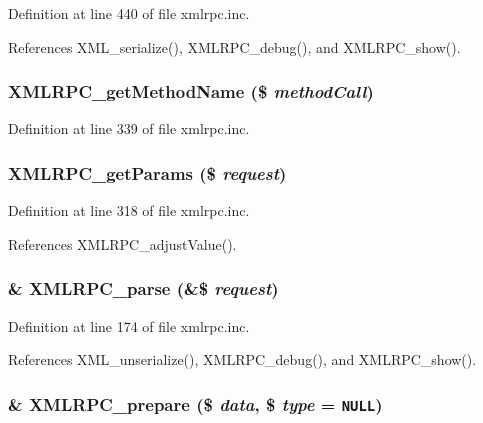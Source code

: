 Definition at line 440 of file xmlrpc.inc.

References XML\_\-serialize(), XMLRPC\_\-debug(), and XMLRPC\_\-show().\hypertarget{xmlrpc_8inc_70efa062e92a380196ed8053850c0906}{
\subsubsection{\setlength{\rightskip}{0pt plus 5cm}XMLRPC\_\-getMethodName (\$ {\em methodCall})}}
\label{xmlrpc_8inc_70efa062e92a380196ed8053850c0906}




Definition at line 339 of file xmlrpc.inc.\hypertarget{xmlrpc_8inc_ce4ea8e1274ca2ee3f51ec5a724f00f3}{
\subsubsection{\setlength{\rightskip}{0pt plus 5cm}XMLRPC\_\-getParams (\$ {\em request})}}
\label{xmlrpc_8inc_ce4ea8e1274ca2ee3f51ec5a724f00f3}




Definition at line 318 of file xmlrpc.inc.

References XMLRPC\_\-adjustValue().\hypertarget{xmlrpc_8inc_708b2136ca600664d2207a511b3cf3f8}{
\subsubsection{\setlength{\rightskip}{0pt plus 5cm}\& XMLRPC\_\-parse (\&\$ {\em request})}}
\label{xmlrpc_8inc_708b2136ca600664d2207a511b3cf3f8}




Definition at line 174 of file xmlrpc.inc.

References XML\_\-unserialize(), XMLRPC\_\-debug(), and XMLRPC\_\-show().\hypertarget{xmlrpc_8inc_c13be54b26e0803d8745e4f019dcfd8a}{
\subsubsection{\setlength{\rightskip}{0pt plus 5cm}\& XMLRPC\_\-prepare (\$ {\em data}, \$ {\em type} = {\tt NULL})}}
\label{xmlrpc_8inc_c13be54b26e0803d8745e4f019dcfd8a}





